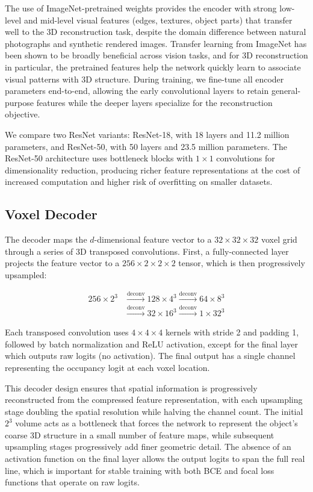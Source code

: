 \documentclass[10pt,twocolumn,letterpaper]{article}
\begin{document}
The use of ImageNet-pretrained weights provides the encoder with strong low-level and mid-level visual features (edges, textures, object parts) that transfer well to the 3D reconstruction task, despite the domain difference between natural photographs and synthetic rendered images. Transfer learning from ImageNet has been shown to be broadly beneficial across vision tasks, and for 3D reconstruction in particular, the pretrained features help the network quickly learn to associate visual patterns with 3D structure. During training, we fine-tune all encoder parameters end-to-end, allowing the early convolutional layers to retain general-purpose features while the deeper layers specialize for the reconstruction objective.

We compare two ResNet variants: ResNet-18, with 18 layers and 11.2 million parameters, and ResNet-50, with 50 layers and 23.5 million parameters. The ResNet-50 architecture uses bottleneck blocks with $1 \times 1$ convolutions for dimensionality reduction, producing richer feature representations at the cost of increased computation and higher risk of overfitting on smaller datasets.

\subsection{Voxel Decoder}

The decoder maps the $d$-dimensional feature vector to a $32 \times 32 \times 32$ voxel grid through a series of 3D transposed convolutions. First, a fully-connected layer projects the feature vector to a $256 \times 2 \times 2 \times 2$ tensor, which is then progressively upsampled:

\begin{align}
256 \times 2^3 &\xrightarrow{\text{deconv}} 128 \times 4^3 \xrightarrow{\text{deconv}} 64 \times 8^3 \nonumber \\
&\xrightarrow{\text{deconv}} 32 \times 16^3 \xrightarrow{\text{deconv}} 1 \times 32^3
\end{align}

Each transposed convolution uses $4 \times 4 \times 4$ kernels with stride 2 and padding 1, followed by batch normalization and ReLU activation, except for the final layer which outputs raw logits (no activation). The final output has a single channel representing the occupancy logit at each voxel location.

This decoder design ensures that spatial information is progressively reconstructed from the compressed feature representation, with each upsampling stage doubling the spatial resolution while halving the channel count. The initial $2^3$ volume acts as a bottleneck that forces the network to represent the object's coarse 3D structure in a small number of feature maps, while subsequent upsampling stages progressively add finer geometric detail. The absence of an activation function on the final layer allows the output logits to span the full real line, which is important for stable training with both BCE and focal loss functions that operate on raw logits.
\end{document}
